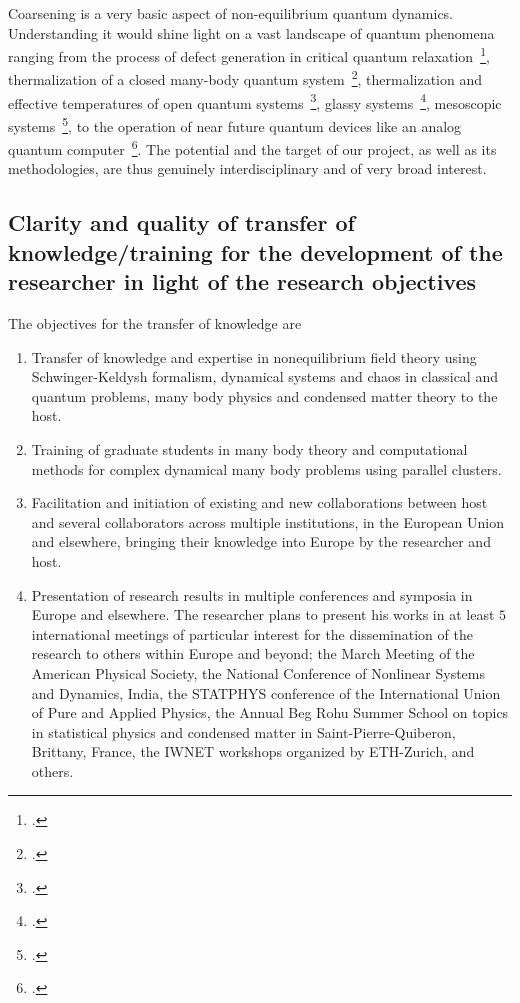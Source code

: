\documentclass[a4paper,11pt]{article}
\begin{document}
Coarsening is a very basic aspect of non-equilibrium quantum dynamics. Understanding it would shine light on a vast landscape of quantum phenomena ranging from the process of defect generation in critical quantum relaxation~\footcite{relaxation}, thermalization of a closed many-body quantum system~\footcite{krishrev, thermalization}, thermalization and effective temperatures of open quantum systems~\footcite{thermopen}, glassy systems~\footcite{glassy}, mesoscopic systems~\footcite{meso}, to the operation of near future quantum devices like an analog quantum computer~\footcite{annealing}. The potential and the target of our project, as well as its methodologies, are thus genuinely interdisciplinary and of very broad interest.

\subsection{Clarity and quality of transfer of knowledge/training for
  the development of the researcher in light of the research objectives}
\label{sec:excellence-training}
The objectives for the transfer of knowledge are
\begin{enumerate}
 \item 
 Transfer of knowledge and expertise in nonequilibrium field theory using Schwinger-Keldysh formalism, dynamical systems and chaos in classical and quantum problems, many body physics and condensed matter theory to the host.
 \item
 Training of graduate students in many body theory and computational methods for complex dynamical many body problems using parallel clusters.
 \item
 Facilitation and initiation of existing and new collaborations between host and several collaborators across multiple institutions, in the European Union and elsewhere, bringing their knowledge into Europe by the researcher and host.
 \item
 Presentation of research results in multiple conferences and symposia in Europe and elsewhere. The researcher plans to present his works in at least $5$ international meetings of particular interest for the dissemination of the research to others within Europe and beyond; the March Meeting of the American Physical Society, the National Conference of Nonlinear Systems and Dynamics, India, the STATPHYS conference of the  International Union of Pure and Applied Physics, the Annual Beg Rohu Summer School on topics in statistical physics and condensed matter in Saint-Pierre-Quiberon, Brittany, France, the IWNET workshops organized by ETH-Zurich, and others.
\end{enumerate}
\end{document}
